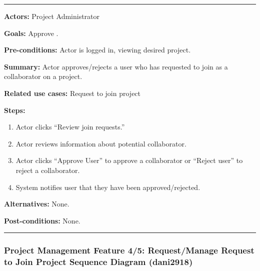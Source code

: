 \documentclass[twoside,letterpaper]{article}
\begin{document}
\vspace{2pt}
\hrule
\vspace{8pt}
\noindent \textbf{Actors:} Project Administrator \newline
 
\noindent \textbf{Goals:} Approve . \newline

\noindent \textbf{Pre-conditions:} Actor is logged in, viewing desired project.  \newline

\noindent \textbf{Summary:} Actor approves/rejects a user who has requested to join as a collaborator on a project.\newline

\noindent \textbf{Related use cases:} Request to join project \newline

\noindent \textbf{Steps:} \begin{enumerate}
  \item Actor clicks ``Review join requests.''
  \item Actor reviews information about potential collaborator.
  \item Actor clicks ``Approve User'' to approve a collaborator or ``Reject user'' to reject a collaborator.
  \item System notifies user that they have been approved/rejected.
 \end{enumerate}
 \textbf{Alternatives:} None. \newline
 
 \noindent  \textbf{Post-conditions:} None. \newline
 \noindent
\vspace{8pt}
\hrule

\newpage

\subsubsection[Project Management Feature 4/5: Request/Manage Request to Join Project Sequence Diagram  (dani2918)]{\rmfamily\bfseries\color{black}
	Project Management Feature 4/5: Request/Manage Request to Join Project Sequence Diagram (dani2918)}

\bigskip
\end{document}
